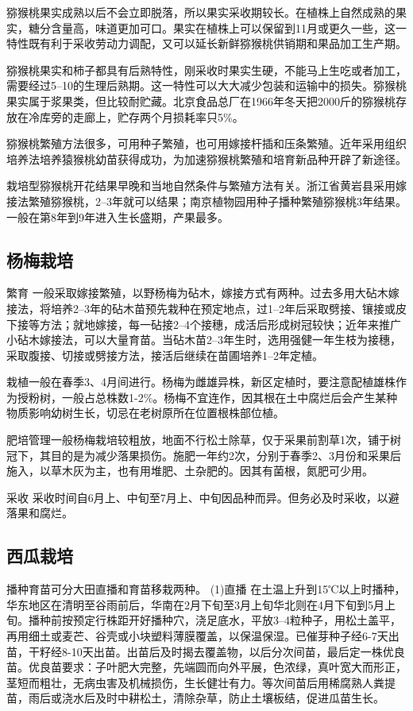 \documentclass{ctexbook}
\begin{document}
猕猴桃果实成熟以后不会立即脱落，所以果实采收期较长。在植株上自然成熟的果实，糖分含量高，味道更加可口。果实在植株上可以保留到11月或更久一些，这一特性既有利于采收劳动力调配，又可以延长新鲜猕猴桃供销期和果品加工生产期。

猕猴桃果实和柿子都具有后熟特性，刚采收时果实生硬，不能马上生吃或者加工，需要经过5--10的生理后熟期。这一特性可以大大减少包装和运输中的损失。猕猴桃果实属于浆果类，但比较耐贮藏。北京食品总厂在1966年冬天把2000斤的猕猴桃存放在冷库旁的走廊上，贮存两个月损耗率只5\%。

猕猴桃繁殖方法很多，可用种子繁殖，也可用嫁接杆插和压条繁殖。近年采用组织培养法培养猿猴桃幼苗获得成功，为加速猕猴桃繁殖和培育新品种开辟了新途径。

栽培型猕猴桃开花结果早晚和当地自然条件与繁殖方法有关。浙江省黄岩县采用嫁接法繁殖猕猴桃，2--3年就可以结果；南京植物园用种子播种繁殖猕猴桃3年结果。一般在第8年到9年进入生长盛期，产果最多。
\subsection{杨梅栽培}
繁育 一般采取嫁接繁殖，以野杨梅为砧木，嫁接方式有两种。过去多用大砧木嫁接法，将培养2--3年的砧木苗预先栽种在预定地点，过1--2年后采取劈接、镶接或皮下接等方法；就地嫁接，每一砧接2--4个接穗，成活后形成树冠较快；近年来推广小砧木嫁接法，可以大量育苗。当砧木苗2--3年生时，选用强健一年生枝为接穗，采取腹接、切接或劈接方法，接活后继续在苗圃培养1--2年定植。

栽植一般在春季3、4月间进行。杨梅为雌雄异株，新区定植时，要注意配植雄株作为授粉树，一般占总株数1-2\%。杨梅不宜连作，因其根在土中腐烂后会产生某种物质影响幼树生长，切忌在老树原所在位置根株部位植。

肥培管理一般杨梅栽培较粗放，地面不行松土除草，仅于采果前割草1次，铺于树冠下，其目的是为减少落果损伤。施肥一年约2次，分别于春季2、3月份和采果后施入，以草木灰为主，也有用堆肥、土杂肥的。因其有菌根，氮肥可少用。

采收 采收时间自6月上、中旬至7月上、中旬因品种而异。但务必及时采收，以避落果和腐烂。
\subsection{西瓜栽培}
播种育苗可分大田直播和育苗移栽两种。
(1)直播 在土温上升到15℃以上时播种，华东地区在清明至谷雨前后，华南在2月下旬至3月上旬华北则在4月下旬到5月上旬。播种前按预定行株距开好播种穴，浇足底水，平放3--4粒种子，用松土盖平，再用细土或麦芒、谷壳或小块塑料薄膜覆盖，以保温保湿。已催芽种子经6-7天出苗，干籽经8-10天出苗。出苗后及时揭去覆盖物，以后分次间苗，最后定一株优良苗。优良苗要求：子叶肥大完整，先端圆而向外平展，色浓绿，真叶宽大而形正，茎短而粗壮，无病虫害及机械损伤，生长健壮有力。等次间苗后用稀腐熟人粪提苗，雨后或浇水后及时中耕松土，清除杂草，防止土壤板结，促进瓜苗生长。
\end{document}
